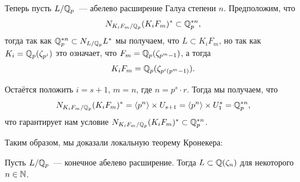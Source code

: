 	Теперь пусть $L/\mathbb{Q}_p$~--- абелево расширение Галуа степени $n$. Предположим, что 
	\[
		N_{K_i F_m/\mathbb{Q}_p}(K_i F_m)^* \subset \mathbb{Q}_p^{* n},
	\]
	тогда так как $\mathbb{Q}_p^{* n} \subset N_{L/\mathbb{Q}_p} L^*$ мы получаем, что $L \subset K_i F_m$, но так как $K_i = \mathbb{Q}_{p}(\zeta_{p^i})$ это означает, что $F_m = \mathbb{Q}_p(\zeta_{p^m - 1})$, а тогда 
	\[
		K_i F_m = \mathbb{Q}_p(\zeta_{p^i(p^m - 1)}). 
	\]

	Остаётся положить $i = s + 1$, $m = n$, где $n = p^s \cdot r$. Тогда мы получаем, что 
	\[
		N_{K_i F_m/\mathbb{Q}_p}(K_i F_m)^*  = \langle p^n \rangle \times U_{s + 1} = \langle p^n \rangle \times U_1^s = \mathbb{Q}_p^{* n},
	\]
	что гарантирует нам условие $N_{K_i F_m/\mathbb{Q}_p}(K_i F_m)^* \subset \mathbb{Q}_p^{* n}$.

	Таким образом, мы доказали локальную теорему Кронекера: 

	\begin{theorem} 
		Пусть $L/\mathbb{Q}_p$~--- конечное абелево расширение. Тогда $L \subset \mathbb{Q}(\zeta_n)$ для некоторого $n \in \mathbb{N}$. 
	\end{theorem}













